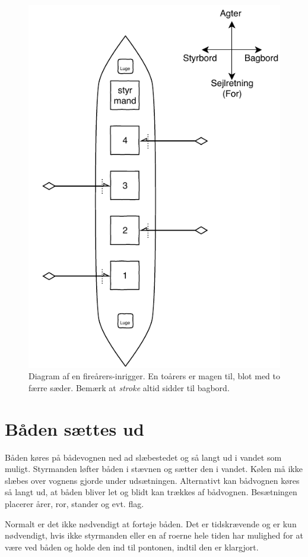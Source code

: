 \documentclass{article}
\begin{document}
\begin{figure}[htpb]
    \centering
    \includegraphics[width=0.8\linewidth]{figs/robaad}
    \caption{Diagram af en fireårers-inrigger. En toårers er magen til,
    blot med to færre sæder. Bemærk at \textit{stroke} altid sidder til
    bagbord.}
    \label{fig:robaad}
\end{figure}

\section{Båden sættes ud}

Båden køres på bådevognen ned ad slæbestedet og så langt ud i vandet som
muligt. Styrmanden løfter båden i stævnen og sætter den i vandet. Kølen
må ikke slæbes over vognens gjorde under udsætningen. Alternativt kan
bådvognen køres så langt ud, at båden bliver let og blidt kan trækkes af
bådvognen. Besætningen placerer årer, ror, stander og evt. flag.

Normalt er det ikke nødvendigt at fortøje båden. Det er tidskrævende og
er kun nødvendigt, hvis ikke styrmanden eller en af roerne hele tiden har
mulighed for at være ved båden og holde den ind til pontonen, indtil den
er klargjort.
\end{document}
